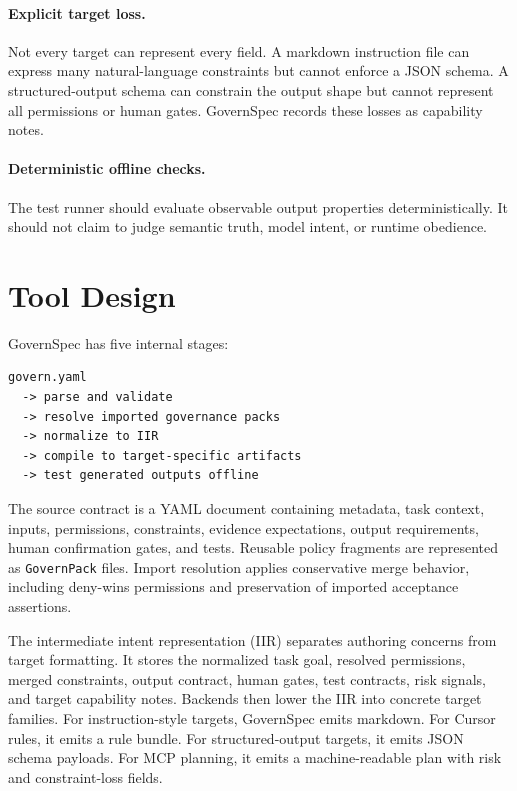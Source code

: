 \documentclass[11pt]{article}
\begin{document}
\paragraph{Explicit target loss.}
Not every target can represent every field. A markdown instruction file can express
many natural-language constraints but cannot enforce a JSON schema. A
structured-output schema can constrain the output shape but cannot represent all
permissions or human gates. GovernSpec records these losses as capability notes.

\paragraph{Deterministic offline checks.}
The test runner should evaluate observable output properties deterministically. It
should not claim to judge semantic truth, model intent, or runtime obedience.

\section{Tool Design}

GovernSpec has five internal stages:
\begin{verbatim}
govern.yaml
  -> parse and validate
  -> resolve imported governance packs
  -> normalize to IIR
  -> compile to target-specific artifacts
  -> test generated outputs offline
\end{verbatim}

The source contract is a YAML document containing metadata, task context, inputs,
permissions, constraints, evidence expectations, output requirements, human
confirmation gates, and tests. Reusable policy fragments are represented as
\texttt{GovernPack} files. Import resolution applies conservative merge behavior,
including deny-wins permissions and preservation of imported acceptance assertions.

The intermediate intent representation (IIR) separates authoring concerns from
target formatting. It stores the normalized task goal, resolved permissions, merged
constraints, output contract, human gates, test contracts, risk signals, and target
capability notes. Backends then lower the IIR into concrete target families. For
instruction-style targets, GovernSpec emits markdown. For Cursor rules, it emits a
rule bundle. For structured-output targets, it emits JSON schema payloads. For MCP
planning, it emits a machine-readable plan with risk and constraint-loss fields.
\end{document}
